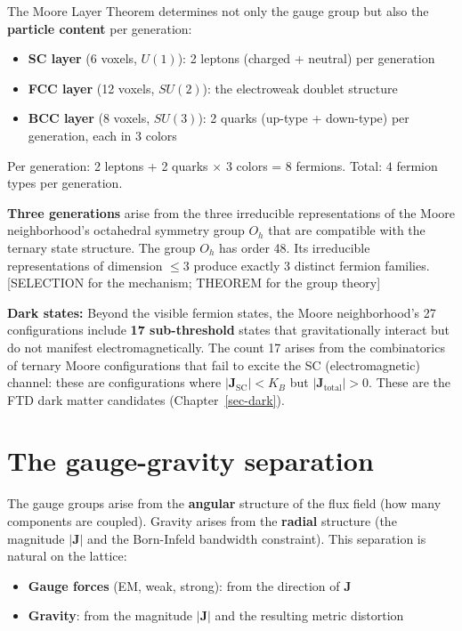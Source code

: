 \documentclass[
  11pt,
  letterpaper,
  twoside,
  openany]{book}
\makeatletter
\providecommand{\tightlist}{%
  \setlength{\itemsep}{0pt}\setlength{\parskip}{0pt}}
\let\orig@section\section
\renewcommand{\section}{\needspace{8\baselineskip}\orig@section}
\makeatother
\begin{document}
The Moore Layer Theorem determines not only the gauge group but also the
\textbf{particle content} per generation:

\begin{itemize}
\tightlist
\item
  \textbf{SC layer} (6 voxels, \(U(1)\)): 2 leptons (charged + neutral)
  per generation
\item
  \textbf{FCC layer} (12 voxels, \(SU(2)\)): the electroweak doublet
  structure
\item
  \textbf{BCC layer} (8 voxels, \(SU(3)\)): 2 quarks (up-type +
  down-type) per generation, each in 3 colors
\end{itemize}

Per generation: 2 leptons + 2 quarks \(\times\) 3 colors = 8 fermions.
Total: \(4\) fermion types per generation.

\textbf{Three generations} arise from the three irreducible
representations of the Moore neighborhood's octahedral symmetry group
\(O_h\) that are compatible with the ternary state structure. The group
\(O_h\) has order 48. Its irreducible representations of dimension
\(\leq 3\) produce exactly 3 distinct fermion families. {[}SELECTION for
the mechanism; THEOREM for the group theory{]}

\textbf{Dark states:} Beyond the visible fermion states, the Moore
neighborhood's 27 configurations include \textbf{17 sub-threshold}
states that gravitationally interact but do not manifest
electromagnetically. The count 17 arises from the combinatorics of
ternary Moore configurations that fail to excite the SC
(electromagnetic) channel: these are configurations where
\(|\mathbf{J}_{\text{SC}}| < K_B\) but
\(|\mathbf{J}_{\text{total}}| > 0\). These are the FTD dark matter
candidates (Chapter~\ref{sec-dark}).

\section{The gauge-gravity
separation}\label{the-gauge-gravity-separation}

The gauge groups arise from the \textbf{angular} structure of the flux
field (how many components are coupled). Gravity arises from the
\textbf{radial} structure (the magnitude \(|\mathbf{J}|\) and the
Born-Infeld bandwidth constraint). This separation is natural on the
lattice:

\begin{itemize}
\tightlist
\item
  \textbf{Gauge forces} (EM, weak, strong): from the direction of
  \(\mathbf{J}\)
\item
  \textbf{Gravity}: from the magnitude \(|\mathbf{J}|\) and the
  resulting metric distortion
\end{itemize}
\end{document}
